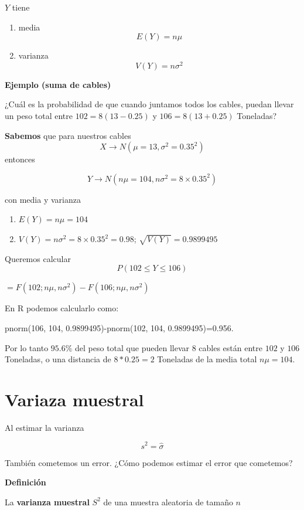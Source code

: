 \documentclass[
]{book}
\providecommand{\tightlist}{%
  \setlength{\itemsep}{0pt}\setlength{\parskip}{0pt}}
\begin{document}
\(Y\) tiene

\begin{enumerate}
\def\labelenumi{\arabic{enumi})}
\tightlist
\item
  media \[E(Y)=n\mu\]
\item
  varianza \[V(Y)=n\sigma^2\]
\end{enumerate}

\textbf{Ejemplo (suma de cables)}

¿Cuál es la probabilidad de que cuando juntamos todos los cables, puedan llevar un peso total entre \(102=8(13 - 0.25)\) y \(106=8(13+ 0.25)\) Toneladas?

\textbf{Sabemos} que para nuestros cables \[X \rightarrow N(\mu=13, \sigma^2=0.35^2)\] entonces

\[Y \rightarrow N(n\mu=104, n\sigma^2=8\times 0.35^2)\]

con media y varianza

\begin{enumerate}
\def\labelenumi{\arabic{enumi})}
\tightlist
\item
  \(E(Y)=n\mu=104\)
\item
  \(V(Y)=n\sigma^2=8\times 0.35^2=0.98\); \(\sqrt{V(Y)}=0.9899495\)
\end{enumerate}

Queremos calcular \[P(102 \leq Y \leq 106)\]

\(=F(102; n\mu, n\sigma^2)-F(106; n\mu, n\sigma^2)\)

En R podemos calcularlo como:

pnorm(106, 104, 0.9899495)-pnorm(102, 104, 0.9899495)=0.956.

Por lo tanto \(95.6\%\) del peso total que pueden llevar \(8\) cables están entre \(102\) y \(106\) Toneladas, o una distancia de \(8*0.25=2\) Toneladas de la media total \(n\mu=104\).

\hypertarget{variaza-muestral}{%
\section{Variaza muestral}\label{variaza-muestral}}

Al estimar la varianza

\[s^2=\hat{\sigma}\]

También cometemos un error. ¿Cómo podemos estimar el error que cometemos?

\textbf{Definición}

La \textbf{varianza muestral} \(S^2\) de una muestra aleatoria de tamaño \(n\)
\end{document}
